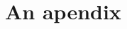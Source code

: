 \documentclass[final,5p,times,twocolumn]{elsarticle}
\begin{document}

%





\appendix

\section{An apendix}
\label{appendix:a}
\end{document}
